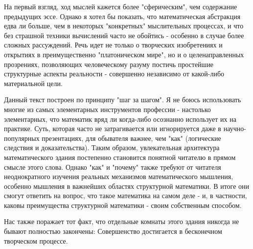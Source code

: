 На первый взгляд, ход мыслей кажется более "сферическим", чем содержание предыдущих эссе. Однако я хотел бы показать, что математическая абстракция едва ли больше, чем в некоторых "конкретных" мыслительных процессах, и что без страшной техники вычислений часто не обойтись - особенно в случае более сложных рассуждений. Речь идет не только о творческих изобретениях и открытиях в преимущественно "платоническом мире", но и о целенаправленных прозрениях, позволяющих человеческому разуму постичь простейшие структурные аспекты реальности - совершенно независимо от какой-либо материальной цели.

Данный текст построен по принципу "шаг за шагом". Я не боюсь использовать многие из самых элементарных инструментов профессии - настолько элементарных, что математик вряд ли когда-либо осознанно использует их на практике. Суть, которая часто не затрагивается или игнорируется даже в научно-популярных презентациях, для обывателя важнее, чем "как" (логические следствия и доказательства). Таким образом, увлекательная архитектура математического здания постепенно становится понятной читателю в прямом смысле этого слова. Однако "как" и "почему" также требуют от читателя неоднократного изучения реальных механизмов математического мышления, особенно мышления в важнейших областях структурной математики. В итоге они смогут ответить на вопрос, что такое математика на самом деле - и, в частности, каковы преимущества структурной математики - своим собственным способом.

Нас также поражает тот факт, что отдельные комнаты этого здания никогда не бывают полностью закончены: Совершенство достигается в бесконечном творческом процессе.
\pagebreak
